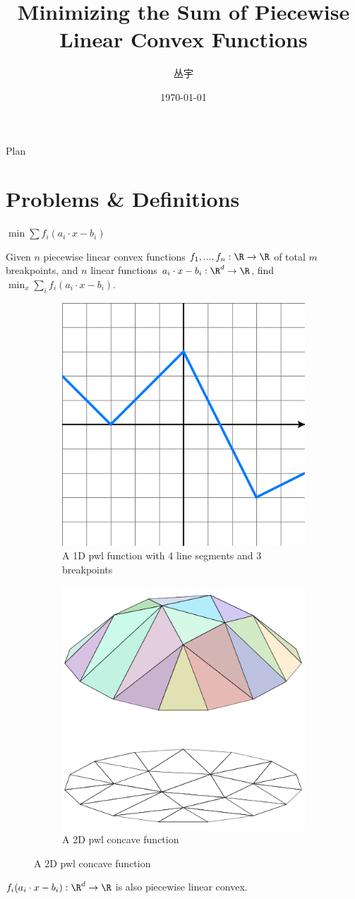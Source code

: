 \documentclass{beamer}
\title[template example]{Minimizing the Sum of Piecewise Linear Convex Functions}
\date{\today}
\author{丛宇}
\begin{document}
\begin{frame}[plain]
    \titlepage
\end{frame}

\begin{frame}[plain]{Plan}
    \tableofcontents
\end{frame}

\section{Problems \& Definitions}
\begin{frame}{$\min \sum f_i(a_i\cdot x-b_i)$}
\begin{problem}
    Given $n$ piecewise linear convex functions $f_1,...,f_n:\R \to \R$ of total $m$ breakpoints, and $n$ linear functions $a_i\cdot x-b_i:\R^d\to \R$, find $\min_x \sum_i f_i(a_i\cdot x-b_i)$.
\end{problem}
\begin{figure}
    \centering
    \begin{subfigure}{.5\textwidth}
      \centering
      \includegraphics[width=.4\linewidth]{images/Piecewise_linear_function.svg.png}
      \caption{A 1D pwl function with 4 line segments and 3 breakpoints}
      \label{fig:sub1}
    \end{subfigure}%
    \begin{subfigure}{.5\textwidth}
      \centering
      \includegraphics[width=.4\linewidth]{images/Piecewise_linear_function2D.png}
      \caption{A 2D pwl concave function}
      \label{fig:sub2}
    \end{subfigure}
    \label{fig:1}
    \end{figure}
    $f_i(a_i\cdot x-b_i):\R^d\to \R$ is also piecewise linear convex.
\end{frame}
\end{document}
